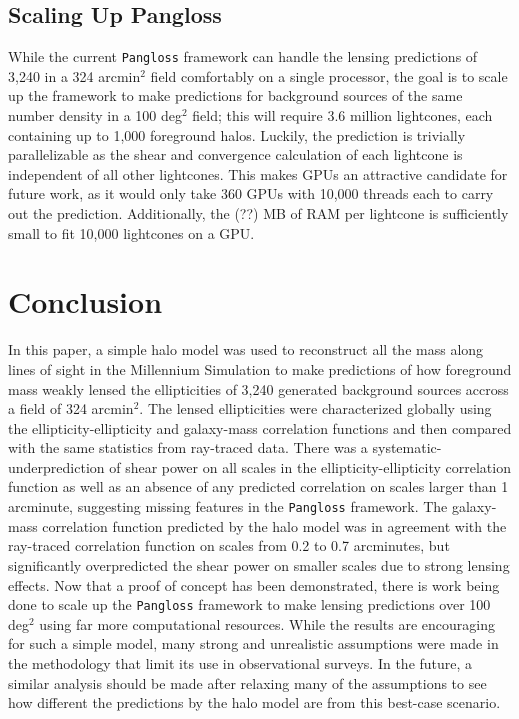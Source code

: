 \documentclass[%
 reprint,
 amsmath,amssymb,
 aps,nofootinbib
]{revtex4-1}
\begin{document}
\subsection*{Scaling Up Pangloss}

While the current \texttt{Pangloss} framework can handle the lensing predictions of 3,240 in a 324 arcmin$^2$ field comfortably on a single processor, the goal is to scale up the framework to make predictions for background sources of the same number density in a 100 deg$^2$ field; this will require 3.6 million lightcones, each containing up to 1,000 foreground halos. Luckily, the prediction is trivially parallelizable as the shear and convergence calculation of each lightcone is independent of all other lightcones. This makes GPUs an attractive candidate for future work, as it would only take 360 GPUs with 10,000 threads each to carry out the prediction. Additionally, the (??) MB of RAM per lightcone is sufficiently small to fit 10,000 lightcones on a GPU.

\section{Conclusion}

In this paper, a simple halo model was used to reconstruct all the mass along lines of sight in the Millennium Simulation to make predictions of how foreground mass weakly lensed the ellipticities of 3,240 generated background sources accross a field of 324 arcmin$^2$. The lensed ellipticities were characterized globally using the ellipticity-ellipticity and galaxy-mass correlation functions and then compared with the same statistics from ray-traced data. There was a systematic-underprediction of shear power on all scales in the ellipticity-ellipticity correlation function as well as an absence of any predicted correlation on scales larger than 1 arcminute, suggesting missing features in the \texttt{Pangloss} framework. The galaxy-mass correlation function predicted by the halo model was in agreement with the ray-traced correlation function on scales from 0.2 to 0.7 arcminutes, but significantly overpredicted the shear power on smaller scales due to strong lensing effects. Now that a proof of concept has been demonstrated, there is work being done to scale up the \texttt{Pangloss} framework to make lensing predictions over 100 deg$^2$ using far more computational resources. While the results are encouraging for such a simple model, many strong and unrealistic assumptions were made in the methodology that limit its use in observational surveys. In the future, a similar analysis should be made after relaxing many of the assumptions to see how different the predictions by the halo model are from this best-case scenario.  
\end{document}
